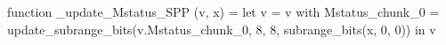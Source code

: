 function _update_Mstatus_SPP (v, x) = let v = { v with Mstatus_chunk_0 = update_subrange_bits(v.Mstatus_chunk_0, 8, 8, subrange_bits(x, 0, 0)) } in
  v
